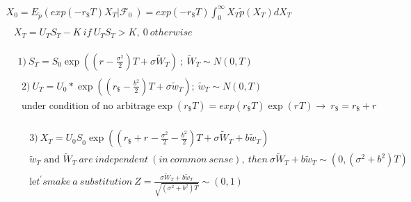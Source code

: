 \documentclass[12pt, a4paper]{article}
\newcommand{\cF}{\mathcal{F}}
\begin{document}
\begin{enumerate}
\[\begin{matrix}
X_{0} = E_{\tilde{p}}\left( exp\left( - r_{\$}T \right)X_{T}\left| \cF_{0} \right.\  \right) = exp\left( - r_{\$}T \right)\int_{0}^{\infty}{X_{T}\tilde{p}\left( X_{T} \right)}dX_{T} \\
\begin{matrix}
\begin{matrix}
X_{T} = U_{T}S_{T} - K\ if\ U_{T}S_{T} > K,\ 0\ otherwise \\
\end{matrix} \\
\begin{matrix}
\begin{matrix}
1)\ S_{T} = S_{0}\exp\left( \left( r_{} - \frac{\sigma^{2}}{2} \right)T + \sigma{\tilde{W}}_{T} \right)\ ;\ {\tilde{W}}_{T}\sim N\left( 0,T \right)\  \\
\begin{matrix}
2)\ U_{T} = U_{0}*\exp\left( \left( r_{\$} - \frac{b^{2}}{2} \right)T + \sigma{\tilde{w}}_{T} \right);\ {\tilde{w}}_{T}\sim N\left( 0,T \right)\  \\
\text{under\ condition\ of\ no\ arbitrage}\exp\left( r_{\$}T \right) = exp\left( r_{\$}T \right)\exp\left( r_{}T \right) \rightarrow \ r_{\$} = r_{\$} + r_{} \\
\end{matrix}\  \\
\begin{matrix}
\begin{matrix}
\begin{matrix}
3)\ X_{T} = {U_{0}S}_{0}\exp\left( \left( r_{\$} + r_{} - \frac{\sigma^{2}}{2} - \frac{b^{2}}{2} \right)T + \sigma{\tilde{W}}_{T} + b{\tilde{w}}_{T} \right)\  \\
{\tilde{w}}_{T}\text{\ and\ }{\tilde{W}}_{T}\ are\ independent\ (in\ common\ sense),\ then\ \sigma{\tilde{W}}_{T} + b{\tilde{w}}_{T}\sim\left( 0,\left( \sigma^{2} + b^{2} \right)T \right) \\
\text{le}t^{'}smake\ a\ substitution\ Z = \frac{\sigma{\tilde{W}}_{T} + b{\tilde{w}}_{T}}{\sqrt{\left( \sigma^{2} + b^{2} \right)T}}\sim\left( 0,1 \right) \\
\end{matrix} \\
\end{matrix} \\
\end{matrix} \\
\end{matrix} \\

\end{matrix}
\end{matrix}
\end{matrix}\]
\end{enumerate}
\end{document}
